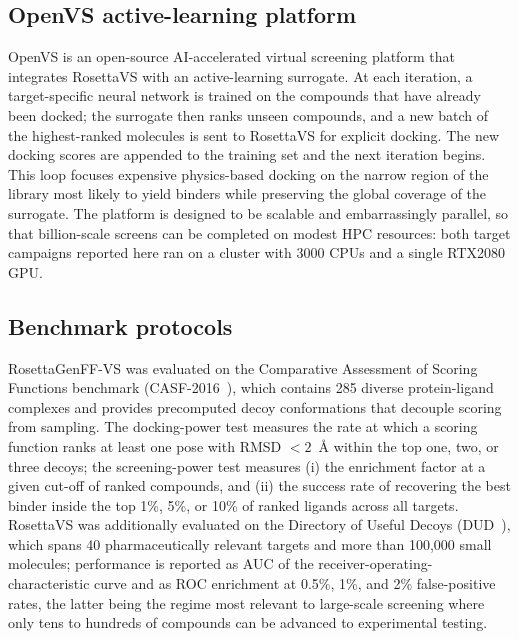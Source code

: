\documentclass[11pt]{article}
\begin{document}
\subsection{OpenVS active-learning platform}
OpenVS is an open-source AI-accelerated virtual screening platform that
integrates RosettaVS with an active-learning surrogate. At each iteration,
a target-specific neural network is trained on the compounds that have
already been docked; the surrogate then ranks unseen compounds, and a
new batch of the highest-ranked molecules is sent to RosettaVS for
explicit docking. The new docking scores are appended to the training set
and the next iteration begins. This loop focuses expensive physics-based
docking on the narrow region of the library most likely to yield binders
while preserving the global coverage of the surrogate. The platform is
designed to be scalable and embarrassingly parallel, so that billion-scale
screens can be completed on modest HPC resources: both target campaigns
reported here ran on a cluster with 3000 CPUs and a single RTX2080 GPU.

\subsection{Benchmark protocols}
RosettaGenFF-VS was evaluated on the Comparative Assessment of Scoring
Functions benchmark (CASF-2016~\citep{su2019casf2016}), which contains 285
diverse protein-ligand complexes and provides precomputed decoy
conformations that decouple scoring from sampling. The docking-power test
measures the rate at which a scoring function ranks at least one pose with
RMSD $< 2$~\AA{} within the top one, two, or three decoys; the
screening-power test measures (i) the enrichment factor at a given cut-off
of ranked compounds, and (ii) the success rate of recovering the best
binder inside the top 1\%, 5\%, or 10\% of ranked ligands across all
targets. RosettaVS was additionally evaluated on the Directory of Useful
Decoys (DUD~\citep{mysinger2012dude}), which spans 40 pharmaceutically
relevant targets and more than 100{,}000 small molecules; performance is
reported as AUC of the receiver-operating-characteristic curve and as
ROC enrichment at 0.5\%, 1\%, and 2\% false-positive rates, the latter
being the regime most relevant to large-scale screening where only tens
to hundreds of compounds can be advanced to experimental testing.
\end{document}
